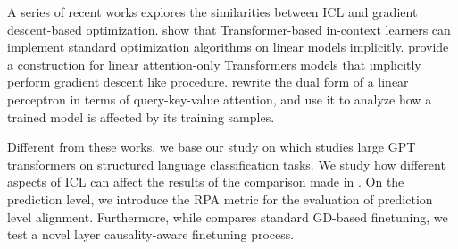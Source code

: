A series of recent works explores the similarities between ICL and gradient descent-based optimization. 
\cite{akyürek2023learning} show that Transformer-based in-context learners can implement standard optimization algorithms on linear models implicitly.
\cite{pmlr-v202-von-oswald23a} provide a construction for linear attention-only Transformers models that implicitly perform gradient descent like procedure.
\cite{irie22dual} rewrite the dual form of a linear perceptron in terms of query-key-value attention, and use it to analyze how a trained model is affected by its training samples.

Different from these works, we base our study on \cite{dai2023gpt} which studies large GPT transformers on structured language classification tasks.
We study how different aspects of ICL can affect the results of the comparison made in \cite{dai2023gpt}.
On the prediction level, we introduce the RPA metric for the evaluation of prediction level alignment.
Furthermore, while \cite{dai2023gpt} compares standard GD-based finetuning, we test a novel layer causality-aware finetuning process.